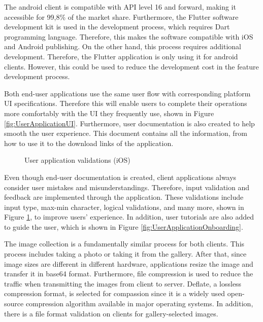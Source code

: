 The android client is compatible with API level 16 and forward, making it accessible for 99,8\% of the market share. Furthermore, the Flutter software development kit is used in the development process, which requires Dart programming language. Therefore, this makes the software compatible with iOS and Android publishing. On the other hand, this process requires additional development. Therefore, the Flutter application is only using it for android clients. However, this could be used to reduce the development cost in the feature development process.

Both end-user applications use the same user flow with corresponding platform UI specifications. Therefore this will enable users to complete their operations more comfortably with the UI they frequently use, shown in Figure \ref{fig:UserApplicationUI}. Furthermore, user documentation is also created to help smooth the user experience. This document contains all the information, from how to use it to the download links of the application. 

\begin{figure}[htbp]
\centering
{}
\caption{User application validations (iOS)}
\label{fig:UserApplicationValidations}
\end{figure}

Even though end-user documentation is created, client applications always consider user mistakes and misunderstandings. Therefore, input validation and feedback are implemented through the application. These validations include input type, max-min character, logical validations, and many more, shown in Figure \ref{fig:UserApplicationValidations}, to improve users' experience. In addition, user tutorials are also added to guide the user, which is shown in Figure \ref{fig:UserApplicationOnboarding}.

The image collection is a fundamentally similar process for both clients. This process includes taking a photo or taking it from the gallery. After that, since image sizes are different in different hardware, applications resize the image and transfer it in base64 format. Furthermore, file compression is used to reduce the traffic when transmitting the images from client to server. Deflate, a lossless compression format, is selected for compassion since it is a widely used open-source compression algorithm available in major operating systems. In addition, there is a file format validation on clients for gallery-selected images. 

